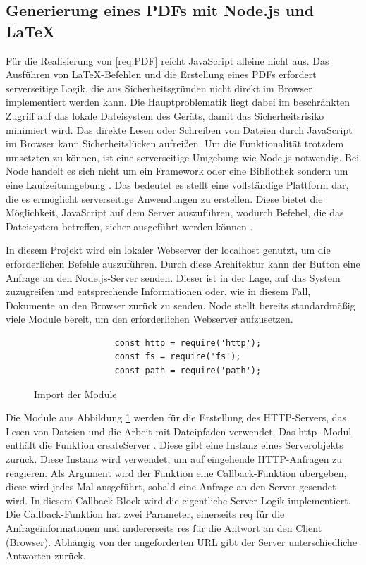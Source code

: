 \documentclass[11pt,a4paper]{report}
\begin{document}
\subsection{Generierung eines PDFs mit Node.js und LaTeX}
Für die Realisierung von \ref{req:PDF} reicht JavaScript alleine nicht aus. Das Ausführen von LaTeX-Befehlen und die Erstellung eines PDFs erfordert serverseitige Logik, die aus Sicherheitsgründen nicht direkt im Browser implementiert werden kann. Die Hauptproblematik liegt dabei im beschränkten Zugriff auf das lokale Dateisystem des Geräts, damit das Sicherheitsrisiko minimiert wird. Das direkte Lesen oder Schreiben von Dateien durch JavaScript im Browser kann Sicherheitslücken aufreißen. Um die Funktionalität trotzdem umsetzten zu können, ist eine serverseitige Umgebung wie Node.js notwendig. Bei Node handelt es sich nicht um ein Framework oder eine Bibliothek sondern um eine Laufzeitumgebung \cite{Syed}. Das bedeutet es stellt eine vollständige Plattform dar, die es ermöglicht serverseitige Anwendungen zu erstellen. Diese bietet die Möglichkeit, JavaScript auf dem Server auszuführen, wodurch Befehel, die das Dateisystem betreffen, sicher ausgeführt werden können \cite{Syed}. 

\noindent
In diesem Projekt wird ein lokaler Webserver der \glqq localhost \grqq{} genutzt, um die erforderlichen Befehle auszuführen. Durch diese Architektur kann der Button eine Anfrage an den Node.js-Server senden. Dieser ist in der Lage, auf das System zuzugreifen und entsprechende Informationen oder, wie in diesem Fall, Dokumente an den Browser zurück zu senden. Node stellt bereits standardmäßig viele Module bereit, um den erforderlichen Webserver aufzusetzen.

\begin{figure}[H]
    \begin{verbatim}
                const http = require('http');
                const fs = require('fs');
                const path = require('path');  
    \end{verbatim}
    \centering
    \caption{Import der Module}
    \label{code:Import_Module}
\end{figure}

\noindent
Die Module aus Abbildung \ref{code:Import_Module} werden für die Erstellung des HTTP-Servers, das Lesen von Dateien und die Arbeit mit Dateipfaden verwendet. Das \glqq http \grqq{}-Modul enthält die Funktion \glqq createServer \grqq{}. Diese gibt eine Instanz eines Serverobjekts zurück. Diese Instanz wird verwendet, um auf eingehende HTTP-Anfragen zu reagieren. Als Argument wird der Funktion eine Callback-Funktion übergeben, diese wird jedes Mal ausgeführt, sobald eine Anfrage an den Server gesendet wird. In diesem Callback-Block wird die eigentliche Server-Logik implementiert. Die Callback-Funktion hat zwei Parameter, einerseits \glqq req \grqq{} für die Anfrageinformationen und andererseits \glqq res \grqq{} für die Antwort an den Client (Browser). Abhängig von der angeforderten URL gibt der Server unterschiedliche Antworten zurück.
\end{document}
